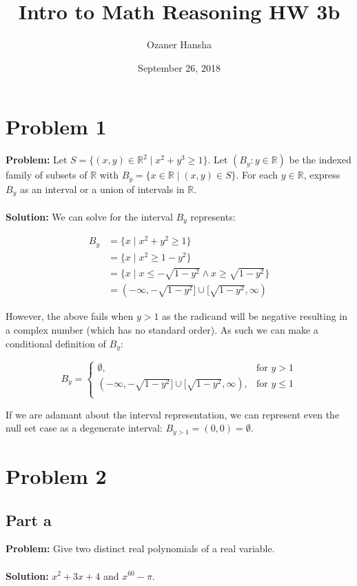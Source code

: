 \documentclass{article}
\begin{document}
\title{Intro to Math Reasoning HW 3b}
\author{Ozaner Hansha}
\date{September 26, 2018}
\maketitle

\section{Problem 1}
\textbf{Problem:} Let $S=\{(x,y)\in\mathbb R^2\mid x^2+y^3\ge 1\}$. Let $(B_y: y\in\mathbb R)$ be the indexed family of subsets of $\mathbb R$ with $B_y=\{x\in\mathbb R\mid (x,y)\in S\}$. For each $y\in\mathbb R$, express $B_y$ as an interval or a union of intervals in $\mathbb R$.
\\\\
\textbf{Solution:} We can solve for the interval $B_y$ represents:

\begin{align*}
  B_y&=\{x\mid x^2+y^2\ge 1\}\\
  &=\{x\mid x^2\ge 1-y^2\}\\
  &=\{x\mid x\le-\sqrt{1-y^2} \wedge x\ge\sqrt{1-y^2}\}\\
  &=(-\infty,-\sqrt{1-y^2}\big]\cup\big[\sqrt{1-y^2},\infty)
\end{align*}

However, the above fails when $y>1$ as the radicand will be negative resulting in a complex number (which has no standard order). As such we can make a conditional definition of $B_y$:

$$B_y=\begin{cases}
\emptyset, & \text{for } y>1\\
(-\infty,-\sqrt{1-y^2}\big]\cup\big[\sqrt{1-y^2},\infty), & \text{for } y\le 1\\
\end{cases}$$

If we are adamant about the interval representation, we can represent even the null set case as a degenerate interval: $B_{y>1}=(0,0)=\emptyset$.

\section{Problem 2}
\subsection{Part a}
\textbf{Problem:} Give two distinct real polynomials of a real variable.
\\\\
\textbf{Solution:} $x^2+3x+4$ and $x^{60}-\pi$.
\end{document}
